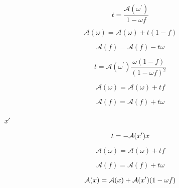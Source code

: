 \begin{equation}
t = \frac{\mathcal{A}(\omega^{\prime})}{1 - \omega f}
\label{eq:delta_m_scaling-adjoint_of_tangent_linear-omega_prime_t}
\end{equation}

\begin{equation}
\mathcal{A}(\omega) = \mathcal{A}(\omega) + t (1 - f)
\label{eq:delta_m_scaling-adjoint_of_tangent_linear-omega_prime_omega_a}
\end{equation}

\begin{equation}
\mathcal{A}(f) = \mathcal{A}(f) - t \omega
\label{eq:delta_m_scaling-adjoint_of_tangent_linear-omega_prime_f_a}
\end{equation}

\begin{equation}
t = \mathcal{A}(\omega^{\prime})\frac{\omega (1 - f)}{(1 - \omega f)^{2}}
\label{eq:delta_m_scaling-adjoint_of_tangent_linear-omega_prime_t2}
\end{equation}

\begin{equation}
\mathcal{A}(\omega) = \mathcal{A}(\omega) + t f
\label{eq:delta_m_scaling-adjoint_of_tangent_linear-omega_prime_omega_a2}
\end{equation}

\begin{equation}
\mathcal{A}(f) = \mathcal{A}(f) + t \omega
\label{eq:delta_m_scaling-adjoint_of_tangent_linear-omega_prime_f_a2}
\end{equation}


\subsubsection{\texorpdfstring{$x^{\prime}$}{Tau}}
\label{sec:delta_m_scaling-adjoint_of_tangent_linear-tau_prime}

\begin{equation}
t = -\mathcal{A}(x^{\prime})x
\label{eq:delta_m_scaling-adjoint_of_tangent_linear-tau_prime_t2}
\end{equation}

\begin{equation}
\mathcal{A}(\omega) = \mathcal{A}(\omega) + t f
\label{eq:delta_m_scaling-adjoint_of_tangent_linear-tau_prime_omega_a}
\end{equation}

\begin{equation}
\mathcal{A}(f) = \mathcal{A}(f) + t \omega
\label{eq:delta_m_scaling-adjoint_of_tangent_linear-tau_prime_f_a}
\end{equation}

\begin{equation}
\mathcal{A}(x) = \mathcal{A}(x) + \mathcal{A}(x^{\prime})(1 - \omega f)
\label{eq:delta_m_scaling-adjoint_of_tangent_linear-tau_prime_tau_a}
\end{equation}
